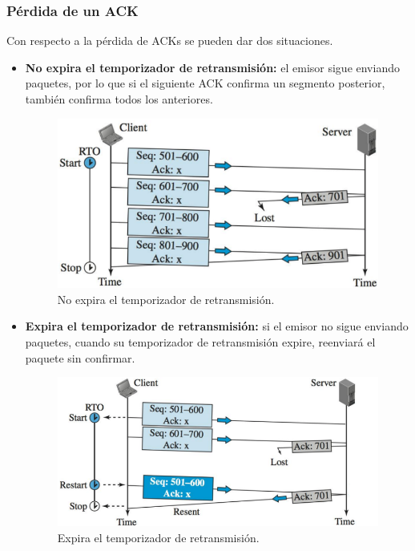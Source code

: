 \subsubsection{Pérdida de un ACK}
Con respecto a la pérdida de ACKs se pueden dar dos situaciones.
\begin{itemize}
    \item \textbf{No expira el temporizador de retransmisión:} el emisor sigue enviando paquetes, por lo que si el siguiente ACK confirma un segmento posterior, también confirma todos los anteriores.
        \begin{figure}[H]\centering
        \includegraphics[width=\textwidth]{img/TCPACK1.png}
        \caption{No expira el temporizador de retransmisión.}\end{figure}
    \item \textbf{Expira el temporizador de retransmisión:} si el emisor no sigue enviando paquetes, cuando su temporizador de retransmisión expire, reenviará el paquete sin confirmar.
        \begin{figure}[H] \centering
        \includegraphics[width=\textwidth]{img/TCPACK2.png}
        \caption{Expira el temporizador de retransmisión.}\end{figure}
\end{itemize}

